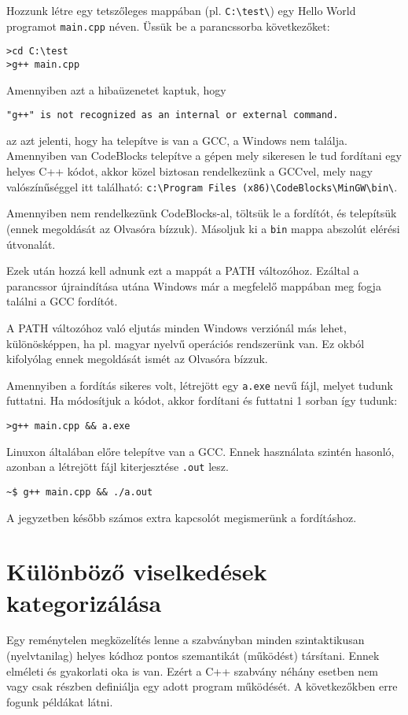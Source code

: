 \documentclass[../cpp_book/cpp_book.tex]{subfiles}
\begin{document}
	Hozzunk létre egy tetszőleges mappában (pl. \texttt{C:\textbackslash test\textbackslash}) egy Hello World programot \texttt{main.cpp} néven. Üssük be a parancssorba következőket:
	\begin{lstlisting}
>cd C:\test
>g++ main.cpp
	\end{lstlisting}
	Amennyiben azt a hibaüzenetet kaptuk, hogy 
	
	{\centering\texttt{"g++" is not recognized as an internal or external command.}\par}
	
	az azt jelenti, hogy ha telepítve is van a GCC, a Windows nem találja. Amennyiben van CodeBlocks telepítve a gépen mely sikeresen le tud fordítani egy helyes C++ kódot, akkor közel biztosan rendelkezünk a GCCvel, mely nagy valószínűséggel itt található: \texttt{c:\textbackslash Program Files (x86)\textbackslash CodeBlocks\textbackslash MinGW\textbackslash bin\textbackslash }.
	 
	Amennyiben nem rendelkezünk CodeBlocks-al, töltsük le a fordítót, és telepítsük (ennek megoldását az Olvasóra bízzuk). Másoljuk ki a \texttt{bin} mappa abszolút elérési útvonalát.
	 
	Ezek után hozzá kell adnunk ezt a mappát a PATH változóhoz. Ezáltal a parancssor újraindítása utána Windows már a megfelelő mappában meg fogja találni a GCC fordítót.
	\begin{note}
	 	A PATH változóhoz való eljutás minden Windows verziónál más lehet, különösképpen, ha pl. magyar nyelvű operációs rendszerünk van. Ez okból kifolyólag ennek megoldását ismét az Olvasóra bízzuk.
	\end{note}
	Amennyiben a fordítás sikeres volt, létrejött egy \texttt{a.exe} nevű fájl, melyet tudunk futtatni. Ha módosítjuk a kódot, akkor fordítani és futtatni 1 sorban így tudunk:
	\begin{lstlisting}
>g++ main.cpp && a.exe
	\end{lstlisting}
	Linuxon általában előre telepítve van a GCC. Ennek használata szintén hasonló, azonban a létrejött fájl kiterjesztése \texttt{.out} lesz.
	\begin{lstlisting}
~$ g++ main.cpp && ./a.out
	\end{lstlisting}
	A jegyzetben később számos extra kapcsolót megismerünk a fordításhoz.

	\section{Különböző viselkedések kategorizálása}
	Egy reménytelen megközelítés lenne a szabványban minden szintaktikusan (nyelvtanilag) helyes kódhoz pontos szemantikát (működést) társítani. Ennek  elméleti és gyakorlati oka is van. Ezért a C++ szabvány néhány esetben nem vagy csak részben definiálja egy adott program működését. A következőkben erre fogunk példákat látni.
\end{document}
